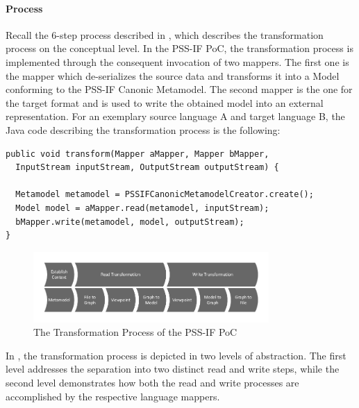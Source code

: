 \paragraph{Process}

Recall the 6-step process described in , which describes the transformation process on the conceptual level. In the PSS-IF PoC, the transformation process is implemented through the consequent invocation of two mappers. The first one is the mapper which de-serializes the source data and transforms it into a Model conforming to the PSS-IF Canonic Metamodel. The second mapper is the one for the target format and is used to write the obtained model into an external representation. For an exemplary source language A and target language B, the Java code describing the transformation process is the following:

\begin{verbatim}
public void transform(Mapper aMapper, Mapper bMapper,
  InputStream inputStream, OutputStream outputStream) {
  
  Metamodel metamodel = PSSIFCanonicMetamodelCreator.create();
  Model model = aMapper.read(metamodel, inputStream);
  bMapper.write(metamodel, model, outputStream);
}
\end{verbatim}

\begin{figure}[h]
\centering
\includegraphics[width=0.8\textwidth]{figures/process.pdf}
\caption{The Transformation Process of the PSS-IF PoC}
\label{fig:transformationprocess}
\end{figure}

In , the transformation process is depicted in two levels of abstraction. The first level addresses the separation into two distinct read and write steps, while the second level demonstrates how both the read and write processes are accomplished by the respective language mappers.
